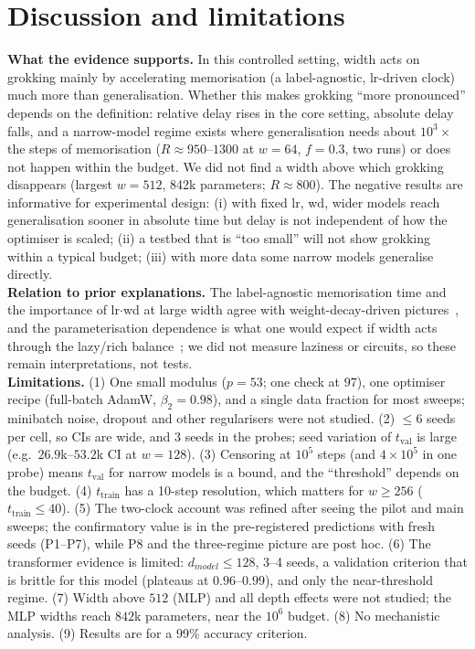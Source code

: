 \documentclass{article}
\newcommand{\ttr}{t_{\mathrm{train}}}
\newcommand{\tva}{t_{\mathrm{val}}}
\begin{document}
\section{Discussion and limitations}
\textbf{What the evidence supports.} In this controlled setting, width acts on grokking mainly by accelerating memorisation (a label-agnostic, lr-driven clock) much more than generalisation. Whether this makes
grokking ``more pronounced'' depends on the definition: relative delay rises in the core setting, absolute delay falls, and a narrow-model regime exists where generalisation needs about $10^3\times$ the steps of memorisation ($R\approx950$--$1300$ at $w{=}64$, $f{=}0.3$, two runs) or does not happen within the budget.
We did not find a width above which grokking disappears (largest $w{=}512$, 842k parameters; $R\approx800$). The negative results are informative for experimental design: (i) with fixed lr, wd, wider models reach generalisation sooner in absolute time but delay is not independent of how the optimiser is scaled;
(ii) a testbed that is ``too small'' will not show grokking within a typical budget; (iii) with more data some narrow models generalise directly.\\
\textbf{Relation to prior explanations.} The label-agnostic memorisation time and the importance of lr$\cdot$wd at large width agree with weight-decay-driven pictures~\citep{varma2023circuit,liu2023omnigrok}, and the parameterisation dependence is
what one would expect if width acts through the lazy/rich balance~\citep{kumar2024grokking}; we did not measure laziness or circuits, so these remain interpretations, not tests.\\
\textbf{Limitations.} (1) One small modulus ($p{=}53$; one check at $97$), one optimiser recipe (full-batch AdamW, $\beta_2{=}0.98$), and a single data fraction for most sweeps; minibatch noise, dropout and other regularisers were not studied.
(2) $\le6$ seeds per cell, so CIs are wide, and 3 seeds in the probes; seed variation of $\tva$ is large (e.g.\ $26.9$k--$53.2$k CI at $w{=}128$). (3) Censoring at $10^5$ steps (and $4\times10^5$ in one probe) means $\tva$ for narrow models is a bound, and the ``threshold'' depends on the budget. (4) $\ttr$ has a 10-step resolution, which matters for $w\ge256$ ($\ttr\le40$). (5) The two-clock account was refined after seeing the pilot and main sweeps; the confirmatory value is in the pre-registered predictions with fresh seeds (P1--P7), while P8 and the three-regime picture are post hoc.
(6) The transformer evidence is limited: $d_{model}\le128$, 3--4 seeds, a validation criterion that is brittle for this model (plateaus at $0.96$--$0.99$), and only the near-threshold regime. (7) Width above $512$ (MLP) and all depth effects were not studied; the MLP widths reach $842$k parameters, near the $10^6$ budget. (8) No mechanistic analysis. (9) Results are for a 99\% accuracy criterion.
\end{document}
